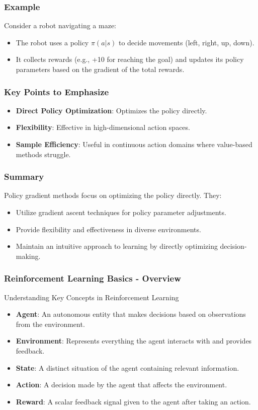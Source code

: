\documentclass[aspectratio=169]{beamer}
\begin{document}
\begin{frame}[fragile]
    \frametitle{Example}
    Consider a robot navigating a maze:
    \begin{itemize}
        \item The robot uses a policy \( \pi(a|s) \) to decide movements (left, right, up, down).
        \item It collects rewards (e.g., +10 for reaching the goal) and updates its policy parameters based on the gradient of the total rewards.
    \end{itemize}
\end{frame}

\begin{frame}[fragile]
    \frametitle{Key Points to Emphasize}
    \begin{itemize}
        \item \textbf{Direct Policy Optimization}: Optimizes the policy directly.
        \item \textbf{Flexibility}: Effective in high-dimensional action spaces.
        \item \textbf{Sample Efficiency}: Useful in continuous action domains where value-based methods struggle.
    \end{itemize}
\end{frame}

\begin{frame}[fragile]
    \frametitle{Summary}
    Policy gradient methods focus on optimizing the policy directly. They:
    \begin{itemize}
        \item Utilize gradient ascent techniques for policy parameter adjustments.
        \item Provide flexibility and effectiveness in diverse environments.
        \item Maintain an intuitive approach to learning by directly optimizing decision-making.
    \end{itemize}
\end{frame}

\begin{frame}[fragile]
    \frametitle{Reinforcement Learning Basics - Overview}
    \begin{block}{Understanding Key Concepts in Reinforcement Learning}
        \begin{itemize}
            \item \textbf{Agent}: An autonomous entity that makes decisions based on observations from the environment.
            \item \textbf{Environment}: Represents everything the agent interacts with and provides feedback.
            \item \textbf{State}: A distinct situation of the agent containing relevant information.
            \item \textbf{Action}: A decision made by the agent that affects the environment.
            \item \textbf{Reward}: A scalar feedback signal given to the agent after taking an action.
        \end{itemize}
    \end{block}
\end{frame}
\end{document}

